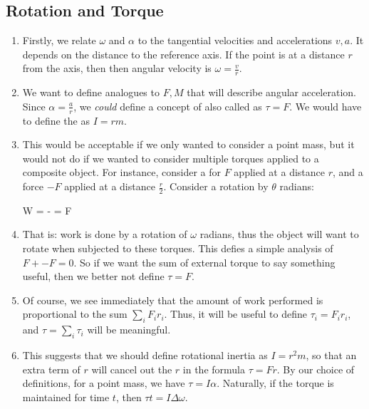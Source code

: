 \subsection{Rotation and Torque}

\begin{enumerate}
  \item Firstly, we relate  $\omega$ and
   $\alpha$ to the tangential velocities
  and accelerations $v, a$. It depends on the distance to the reference
  axis. If the point is at a distance $r$ from the axis, then then
  angular velocity is $\omega = \frac{v}{r}$.

  \item We want to define analogues to $F, M$ that will describe angular
  acceleration. Since $\alpha = \frac{a}{r}$, we \emph{could} define a
  concept of  also called  as
  $\tau = F$. We would have to define the  as
  $I = rm$.

  \item This would be acceptable if we only wanted to consider a point
  mass, but it would not do if we wanted to consider multiple torques
  applied to a composite object. For instance, consider a for $F$
  applied at a distance $r$, and a force $-F$ applied at a distance
  $\frac{r}{2}$. Consider a rotation by $\theta$ radians:

  \begin{nedqn}
    W
  =
     - 
  =
    F  \omega
  \end{nedqn}

  \item That is: work is done by a rotation of $\omega$ radians, thus
  the object will want to rotate when subjected to these torques. This
  defies a simple analysis of $F + -F = 0$. So if we want the sum of
  external torque to say something useful, then we better not define
  $\tau = F$.

  \item Of course, we see immediately that the amount of work performed
  is proportional to the sum $\sum_i F_i r_i$. Thus, it will be useful
  to define $\tau_i = F_i r_i$, and $\tau = \sum_i \tau_i$ will be
  meaningful.

  \item This suggests that we should define rotational inertia as $I =
  r^2 m$, so that an extra term of $r$ will cancel out the $r$ in the
  formula $\tau = F r$. By our choice of definitions, for a point mass,
  we have $\tau = I \alpha$. Naturally, if the torque is maintained for
  time $t$, then $\tau t = I \Delta \omega$.


\end{enumerate}

